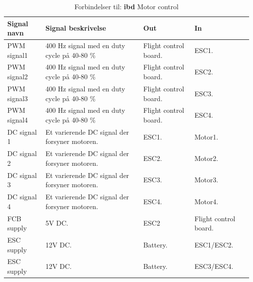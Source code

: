 \begin{table}[H]
	\centering
		\begin{tabular}{|p{2.5 cm}|p{5.5 cm}|p{2.5 cm}|p{2.5 cm}|} 
		\hline
			\textbf{Signal navn} 	& \textbf{Signal beskrivelse}		& \textbf{Out} 				& \textbf{In}     \\ \hline
			PWM signal1 & 400 Hz signal med en duty cycle på 40-80 $\%$ & Flight control board. & ESC1.	\\ \hline
			PWM signal2 & 400 Hz signal med en duty cycle på 40-80 $\%$ & Flight control board. & ESC2.	\\ \hline
			PWM signal3 & 400 Hz signal med en duty cycle på 40-80 $\%$ & Flight control board. &	ESC3. \\ \hline
			PWM signal4 & 400 Hz signal med en duty cycle på 40-80 $\%$ & Flight control board. & ESC4. \\ \hline
			DC signal 1 & Et varierende DC signal der forsyner motoren. & ESC1. & Motor1.	\\ \hline
			DC signal 2 & Et varierende DC signal der forsyner motoren. & ESC2. & Motor2.	\\ \hline
			DC signal 3 & Et varierende DC signal der forsyner motoren. & ESC3. & Motor3.	\\ \hline
			DC signal 4 & Et varierende DC signal der forsyner motoren. & ESC4. & Motor4.	\\ \hline
			FCB supply & 5V DC. & ESC2 & Flight control board.	\\ \hline
			ESC supply & 12V DC. & Battery. & ESC1/ESC2.	\\ \hline
			ESC supply & 12V DC. & Battery. & ESC3/ESC4.	\\ \hline
		\end{tabular}
	\caption{Forbindelser til: \textbf{ibd} Motor control}
	\label{tab:IBD_Motor_control}
\end{table}

